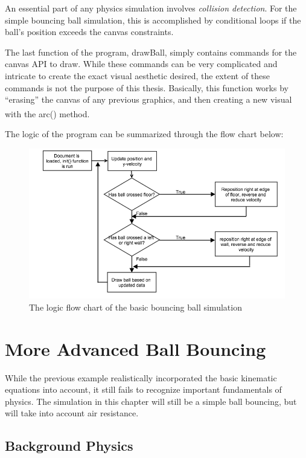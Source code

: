 An essential part of any physics simulation involves \textit{collision detection}.  For the simple bouncing ball simulation, this is accomplished by conditional loops if the ball's position exceeds the canvas constraints.  


The last function of the program, drawBall, simply contains commands for the canvas API to draw.  While these commands can be very complicated and intricate to create the exact visual aesthetic desired, the extent of these commands is not the purpose of this thesis.  Basically, this function works by ``erasing'' the canvas of any previous graphics, and then creating a new visual with the arc() method.\textsuperscript{\cite{basichtml5}}   

The logic of the program can be summarized through the flow chart below:


\begin{figure}[h] 
	\centering
		\includegraphics[width=15cm]{Figures/basicbouncingball.png}

	\caption{The logic flow chart of the basic bouncing ball simulation}
	\label{fig:basicbouncingball}
\end{figure}




\section{More Advanced Ball Bouncing}

While the previous example realistically incorporated the basic kinematic equations into account, it still fails to recognize important fundamentals of physics.  The simulation in this chapter will still be a simple ball bouncing, but will take into account air resistance.

\subsection{Background Physics}


